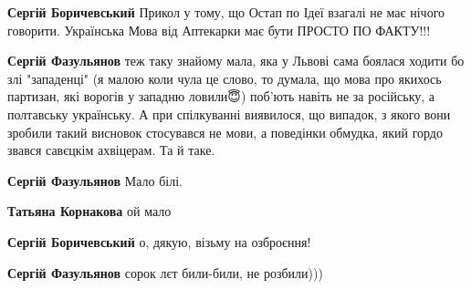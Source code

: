 \begin{itemize}
\begin{itemize}
\textbf{Сергій Боричевський} Прикол у тому, що Остап по Ідеї взагалі не має
нічого говорити. Українська Мова від Аптекарки має бути ПРОСТО ПО ФАКТУ!!!

 
\textbf{Сергій Фазульянов} теж таку знайому мала, яка у Львові сама боялася ходити бо злі "западенці" (я малою коли чула це слово, то думала, що мова про якихось партизан, які ворогів у западню ловили😇) поб'ють навіть не за російську, а полтавську українську. А при спілкуванні виявилося, що випадок, з якого вони зробили такий висновок стосувався не мови, а поведінки обмудка, який гордо звався савєцкім ахвіцерам. Та й таке.🧐

 
\textbf{Сергій Фазульянов} Мало білі.

 
\textbf{Татьяна Корнакова} ой мало

 
\textbf{Сергій Боричевський} о, дякую, візьму на озброєння!

 
\textbf{Сергій Фазульянов} сорок лєт били-били, не розбили)))

 

\end{itemize}
\end{itemize}
